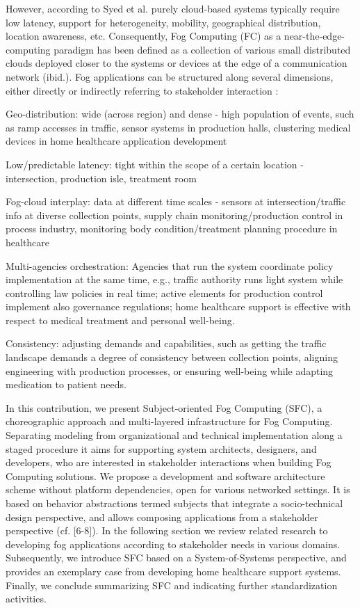 However, according to Syed et al. \cite{article:FogPattern} purely cloud-based systems typically require low latency, support for heterogeneity, mobility, geographical distribution, location awareness, etc. Consequently, Fog Computing (FC) as a near-the-edge-computing paradigm has been defined as a collection of various small distributed clouds deployed closer to the systems or devices at the edge of a communication network (ibid.). Fog applications can be structured along several dimensions, either directly or indirectly referring to stakeholder interaction \cite{article:OoTAnalytics}:
\begin{list}{-}{spacing}
	\item Geo-distribution: wide (across region) and dense - high population of events, such as ramp accesses in traffic, sensor systems in production halls, clustering medical devices in home healthcare application development
	\item Low/predictable latency: tight within the scope of a certain location - intersection, production isle, treatment room
	\item Fog-cloud interplay: data at different time scales - sensors at intersection/traffic info at diverse collection points, supply chain monitoring/production control in process industry, monitoring body condition/treatment planning procedure in healthcare
	\item Multi-agencies orchestration: Agencies that run the system coordinate policy implementation at the same time, e.g., traffic authority runs light system while controlling law policies in real time; active elements for production control implement also governance regulations; home healthcare support is effective with respect to medical treatment and personal well-being.
	\item Consistency: adjusting demands and capabilities, such as getting the traffic landscape demands a degree of consistency between collection points, aligning engineering with production processes, or ensuring well-being while adapting medication to patient needs.
\end{list}

In this contribution, we present Subject-oriented Fog Computing (SFC), a choreographic approach and multi-layered infrastructure for Fog Computing. Separating modeling from organizational and technical implementation along a staged procedure it aims for supporting system architects, designers, and developers, who are interested in stakeholder interactions when building Fog Computing solutions. We propose a development and software architecture scheme without platform dependencies, open for various networked settings. It is based on behavior abstractions termed subjects that integrate a socio-technical design perspective, and allows composing applications from a stakeholder perspective (cf. [6-8]).
In the following section we review related research to developing fog applications according to stakeholder needs in various domains. Subsequently, we introduce SFC based on a System-of-Systems perspective, and provides an exemplary case from developing home healthcare support systems. Finally, we conclude summarizing SFC and indicating further standardization activities.

